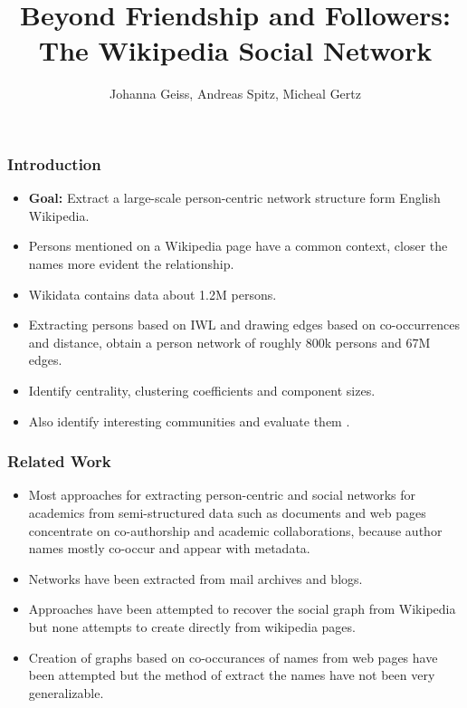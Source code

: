 \documentclass[10pt, compress]{beamer}
\title{Beyond Friendship and Followers: The Wikipedia Social Network}
\subtitle{}
\author{Johanna Geiss, Andreas 	Spitz, Micheal Gertz}
\institute{Vaibhav Sinha, Vishwak S., Chandra Kiran Evuru\\
\texttt{CS15BTECH110\{34, 43, 12\}}}
\begin{document}
\maketitle

\begin{frame}[fragile]
  \frametitle{Introduction}
\begin{itemize}
  \item \textbf{Goal:} Extract a large-scale person-centric network structure form English Wikipedia.
  \item Persons mentioned on a Wikipedia page have a common context, closer the names more evident the relationship.
  \item Wikidata contains data about 1.2M persons.
  \item Extracting persons based on IWL and drawing edges based on co-occurrences and distance, obtain a person network of roughly 800k persons and 67M edges.
  \item Identify centrality, clustering coefficients and component sizes.
  \item Also identify interesting communities and evaluate them .
  
\end{itemize}
\normalsize
\end{frame}

\begin{frame}[fragile]
  \frametitle{Related Work}
\begin{itemize}
\item Most approaches for extracting person-centric and social networks for academics from semi-structured data such as documents and web pages concentrate on co-authorship and academic collaborations, because author names mostly co-occur and appear with metadata.
\item Networks have been extracted from mail archives and blogs.
\item Approaches have been attempted to recover the social graph from Wikipedia but none attempts to create directly from wikipedia pages.
\item Creation of graphs based on co-occurances of names from web pages have been attempted but the method of extract the names have not been very generalizable.
\end{itemize}
\tiny
\normalsize
\end{frame}
\end{document}
